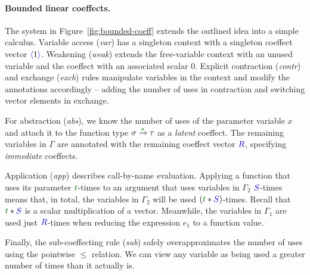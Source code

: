 \paragraph{Bounded linear coeffects.}
The system in Figure~\ref{fig:bounded-coeff} extends the outlined idea into a simple calculus.
Variable access (\emph{var}) has a singleton context with a singleton coeffect vector
$\alift{1}$. Weakening (\emph{weak}) extends the free-variable context with an unused variable and 
the coeffect with an associated scalar $0$. Explicit contraction (\emph{contr}) and
exchange (\emph{exch}) rules manipulate variables in the context and
modify the annotations accordingly -- adding the number of uses in
contraction and switching vector elements in exchange.

For abstraction (\emph{abs}), we know the number of uses of the parameter variable $x$ 
and attach it to the function type $\sigma \xrightarrow{\cclrd{s}}
\tau$ as a \emph{latent} coeffect. The remaining variables in $\Gamma$ are 
annotated with the remaining coeffect vector $\aclrd{R}$, specifying \emph{immediate} coeffects.

Application (\emph{app}) describes call-by-name evaluation.  Applying
a function that uses its parameter $\cclrd{t}$-times to an argument
that uses variables in $\Gamma_2$ $\aclrd{S}$-times means that, in
total, the variables in $\Gamma_2$ will be used $(\cclrd{t} \ast \aclrd{S})$-times. 
Recall that $\cclrd{t} \ast \aclrd{S}$ is a scalar multiplication of a
vector. Meanwhile, the variables in $\Gamma_1$ are used just
$\aclrd{R}$-times when reducing the expression $e_1$ to a function
value. 

Finally, the sub-coeffecting rule (\emph{sub}) safely overapproximates
the number of uses using the pointwise
$\leq$ relation. We can view any variable as being used a greater
number of times than it actually is.

